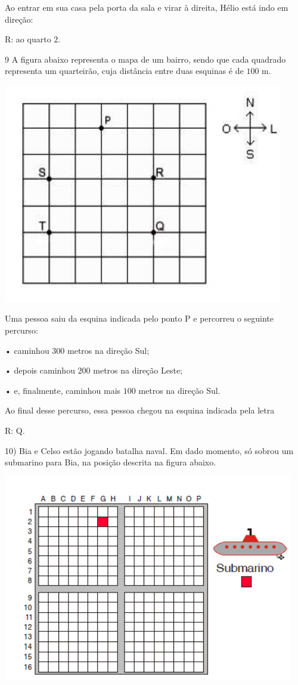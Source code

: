 Ao entrar em sua casa pela porta da sala e virar à direita, Hélio está
indo em direção:

R: ao quarto $2$.

\num{9}  A figura abaixo representa o mapa de um bairro, sendo que cada
quadrado representa um quarteirão, cuja distância entre duas esquinas é
de $100$ m.

\includegraphics[width=4.82569in,height=3.77917in]{./imgSAEB_6_MAT/media/image72.png}

Uma pessoa saiu da esquina indicada pelo ponto P e percorreu o seguinte
percurso:

• caminhou $300$ metros na direção Sul;

• depois caminhou $200$ metros na direção Leste;

• e, finalmente, caminhou mais $100$ metros na direção Sul.

Ao final desse percurso, essa pessoa chegou na esquina indicada pela
letra

R: Q.

10) Bia e Celso estão jogando batalha naval. Em dado momento, só sobrou
um submarino para Bia, na posição descrita na figura abaixo.

\includegraphics[width=5in,height=3.55208in]{./imgSAEB_6_MAT/media/image73.png}

